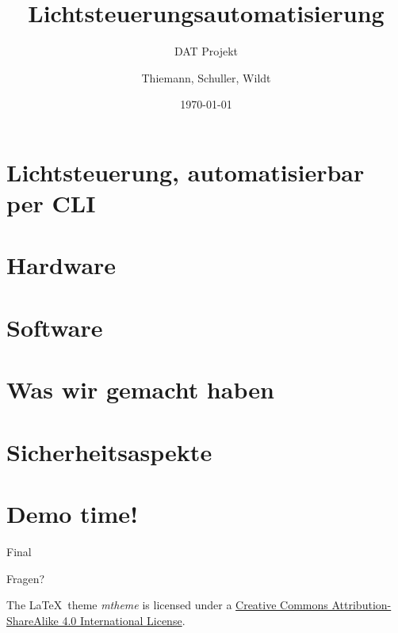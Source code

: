 \documentclass[10pt, compress]{beamer}
\title{Lichtsteuerungsautomatisierung}
\subtitle{DAT Projekt}
\date{\today}
\author{Thiemann, Schuller, Wildt}
\institute{Hochschule Rosenheim}
\begin{document}
\maketitle

\section{Lichtsteuerung, automatisierbar per CLI}



\section{Hardware}



\section{Software}



\section{Was wir gemacht haben}



\section{Sicherheitsaspekte}



\section{Demo time!}



\begin{frame}{Final}

  \begin{center}\huge Fragen?\end{center}
    
  \vspace{1cm}
  \begin{center}
  {\small

  The \LaTeX \ theme \emph{mtheme} is licensed under a
  \href{http://creativecommons.org/licenses/by-sa/4.0/}{Creative Commons
  Attribution-ShareAlike 4.0 International License}.}

  \ccbysa
  
  \end{center}

\end{frame}
\end{document}
